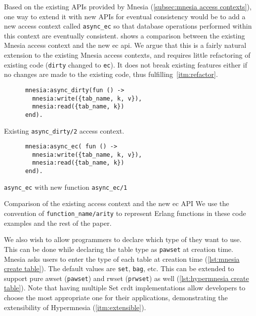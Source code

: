 Based on the existing APIs provided by Mnesia (\cref{subsec:mnesia access contexts}), 
one way to extend it with new APIs for eventual consistency would be to add a
new access context called \texttt{async_ec} so that database operations
performed within this context are eventually consistent. 
shows a comparison between the existing Mnesia access context and the new 
\acrshort{ec} \acrshort{api}.
We argue that this is a fairly natural extension to the existing Mnesia access 
contexts,
and requires little refactoring of existing code (\verb|dirty| changed to \verb|ec|). 
It does not break existing features either if no changes
are made to the existing code, thus fulfilling~\cref{itm:refactor}.

\begin{listing}[htp]
  \begin{sublisting}{0.48\columnwidth}
    \begin{verbatim}
      mnesia:async_dirty(fun () -> 
        mnesia:write({tab_name, k, v}),
        mnesia:read({tab_name, k})
      end).
    \end{verbatim}
    \caption{Existing \texttt{async\_dirty/2} access context.}
  \end{sublisting}
  \hfill
  \begin{sublisting}{0.48\columnwidth}
    \begin{verbatim}
      mnesia:async_ec( fun () -> 
        mnesia:write({tab_name, k, v}),
        mnesia:read({tab_name, k})
      end).
    \end{verbatim}
    \caption{\texttt{async\_ec} with new function \texttt{async\_ec/1}}
  \end{sublisting}
  \caption{Comparison of the existing access context and the new \acrfull{ec} API 
  We use the convention of \texttt{function\_name/arity} to represent Erlang 
  functions in these code examples and the rest of the paper.}
  \label{lst:mnesia ec activity}
\end{listing}

We also wish to allow programmers to declare which type of  they
want to use. This can be done while declaring the table type as \texttt{pawset}
at creation time. Mnesia asks users to enter the type of each
table at creation time (\cref{lst:mnesia create table}). The default values are 
\texttt{set}, \texttt{bag}, etc. This can be extended
to support pure \acrshort{awset} (\texttt{pawset}) and \acrshort{rwset} (\texttt{prwset}) 
as well 
(\cref{lst:hypermnesia create table}). Note that having multiple Set \acrshort{crdt}
implementations allow developers to choose the most appropriate one for their
applications, demonstrating the extensibility of Hypermnesia (\cref{itm:extensible}).

